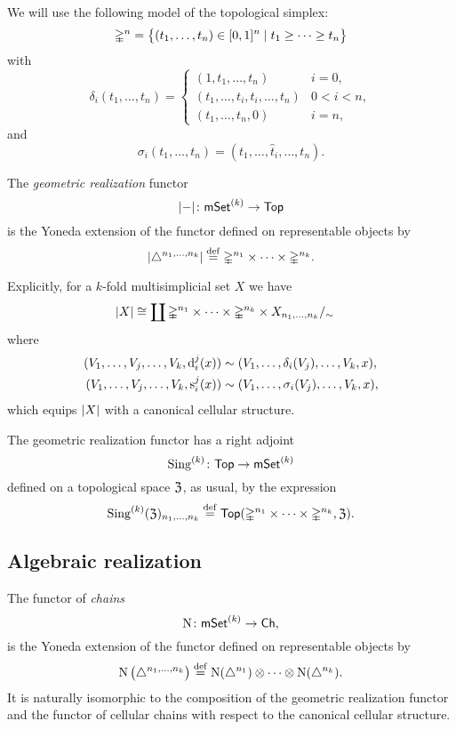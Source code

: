 We will use the following model of the topological simplex:
\[
\mathbb{\Delta}^n = \big\{
(t_1, \dots, t_n) \in [0,1]^n \mid t_1 \geq \dots \geq t_n
\big\}
\]
with
\[
\delta_i(t_1, \dots, t_n) =
\begin{cases}
	(1, t_1, \dots, t_n) & i = 0, \\
	(t_1, \dots, t_i, t_i, \dots, t_n) & 0 < i < n, \\
	(t_1, \dots, t_n, 0) & i = n,
\end{cases}
\]
and
\[
\sigma_i(t_1, \dots, t_n) = (t_1, \dots, \widehat t_i, \dots, t_n).
\]

The \textit{geometric realization} functor
\[
\lvert-\rvert \colon \mathsf{mSet}^{(k)} \to \mathsf{Top}
\]
is the Yoneda extension of the functor defined on representable objects by
\[
\lvert\triangle^{n_1,\dots,n_k}\rvert \stackrel{\mathrm{def}}{=}
\mathbb{\Delta}^{n_1}\times\dots\times\mathbb{\Delta}^{n_k}.
\]

Explicitly, for a $k$-fold multisimplicial set $X$ we have
\begin{align*}
	\lvert X\rvert &\cong
	\coprod \mathbb{\Delta}^{n_1}\times\dots\times\mathbb{\Delta}^{n_k} \times X_{n_1,\dots,n_k} /_\sim
\end{align*}
where
\[
\begin{split}
	(V_1, \dots, V_j, \dots, V_k, \operatorname{d}^j_i(x)) &\sim (V_1, \dots, \delta_i(V_j), \dots, V_k, x), \\
	(V_1, \dots, V_j, \dots, V_k, \operatorname{s}^j_i(x)) &\sim (V_1, \dots, \sigma_i(V_j), \dots, V_k, x),
\end{split}
\]
which equips $\lvert X\rvert$ with a canonical cellular structure.

The geometric realization functor has a right adjoint
\[
\operatorname{Sing}^{(k)} \colon \mathsf{Top} \to \mathsf{mSet}^{(k)}
\]
defined on a topological space $\mathfrak{Z}$, as usual, by the expression
\[
\operatorname{Sing}^{(k)}(\mathfrak{Z})_{n_1,\dots,n_k} \stackrel{\mathrm{def}}{=}
\mathsf{Top}(\mathbb{\Delta}^{n_1}\times\dots\times\mathbb{\Delta}^{n_k},\mathfrak{Z}).
\]

\subsection{Algebraic realization}\label{ss:algebraic realization}

The functor of \textit{chains}
\[
\operatorname{N} \colon \mathsf{mSet}^{(k)} \to \mathsf{Ch},
\]
is the Yoneda extension of the functor defined on representable objects by
\[
\operatorname{N} \big( \triangle^{n_1, \dots, n_k} \big) \stackrel{\mathrm{def}}{=}
\operatorname{N}(\triangle^{n_1}) \otimes \dotsb \otimes \operatorname{N}(\triangle^{n_k}).
\]
It is naturally isomorphic to the composition of the geometric realization functor and the functor of cellular chains with respect to the canonical cellular structure.

